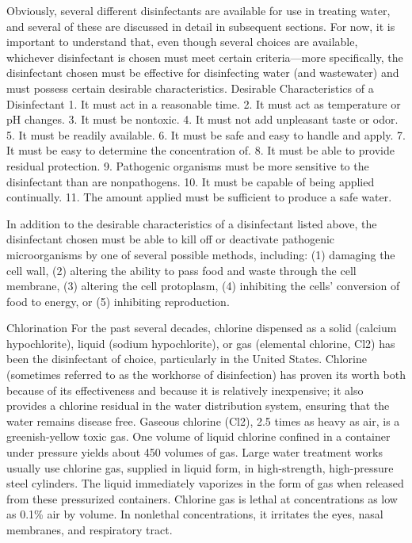\documentclass{article}
\begin{document}
Obviously, several different disinfectants are available for use in
treating water, and several of these are discussed in detail in
subsequent sections. For now, it is important to understand that, even
though several choices are available, whichever disinfectant is chosen
must meet certain criteria---more specifically, the disinfectant chosen
must be effective for disinfecting water (and wastewater) and must
possess certain desirable characteristics. Desirable Characteristics of
a Disinfectant 1. It must act in a reasonable time. 2. It must act as
temperature or pH changes. 3. It must be nontoxic. 4. It must not add
unpleasant taste or odor. 5. It must be readily available. 6. It must be
safe and easy to handle and apply. 7. It must be easy to determine the
concentration of. 8. It must be able to provide residual protection. 9.
Pathogenic organisms must be more sensitive to the disinfectant than are
nonpathogens. 10. It must be capable of being applied continually. 11.
The amount applied must be sufficient to produce a safe water.

In addition to the desirable characteristics of a disinfectant listed
above, the disinfectant chosen must be able to kill off or deactivate
pathogenic microorganisms by one of several possible methods, including:
(1) damaging the cell wall, (2) altering the ability to pass food and
waste through the cell membrane, (3) altering the cell protoplasm, (4)
inhibiting the cells' conversion of food to energy, or (5) inhibiting
reproduction.

Chlorination For the past several decades, chlorine dispensed as a solid
(calcium hypochlorite), liquid (sodium hypochlorite), or gas (elemental
chlorine, Cl2) has been the disinfectant of choice, particularly in the
United States. Chlorine (sometimes referred to as the workhorse of
disinfection) has proven its worth both because of its effectiveness and
because it is relatively inexpensive; it also provides a chlorine
residual in the water distribution system, ensuring that the water
remains disease free. Gaseous chlorine (Cl2), 2.5 times as heavy as air,
is a greenish-yellow toxic gas. One volume of liquid chlorine confined
in a container under pressure yields about 450 volumes of gas. Large
water treatment works usually use chlorine gas, supplied in liquid form,
in high-strength, high-pressure steel cylinders. The liquid immediately
vaporizes in the form of gas when released from these pressurized
containers. Chlorine gas is lethal at concentrations as low as 0.1\% air
by volume. In nonlethal concentrations, it irritates the eyes, nasal
membranes, and respiratory tract.
\end{document}
